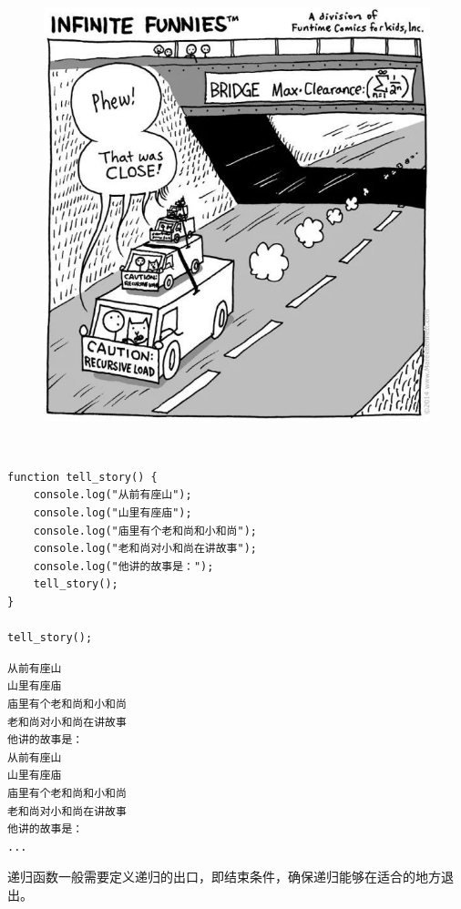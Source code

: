 \begin{figure}[H]
	\centering
	\includegraphics[scale=0.6]{img/C13/13-3/5.png}
\end{figure}

 \\

\begin{lstlisting}[style=htmlcssjs]
function tell_story() {
    console.log("从前有座山");
    console.log("山里有座庙");
    console.log("庙里有个老和尚和小和尚");
    console.log("老和尚对小和尚在讲故事");
    console.log("他讲的故事是：");
    tell_story();
}

tell_story();
\end{lstlisting}

\begin{tcolorbox}
	\begin{verbatim}
从前有座山
山里有座庙
庙里有个老和尚和小和尚
老和尚对小和尚在讲故事
他讲的故事是：
从前有座山
山里有座庙
庙里有个老和尚和小和尚
老和尚对小和尚在讲故事
他讲的故事是：
...
	\end{verbatim}
\end{tcolorbox}

递归函数一般需要定义递归的出口，即结束条件，确保递归能够在适合的地方退出。 \\

